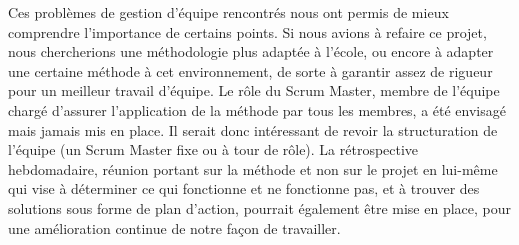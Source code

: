 
Ces problèmes de gestion d'équipe rencontrés nous ont permis de mieux comprendre l'importance de certains points. Si nous avions à refaire ce projet, nous chercherions une méthodologie plus adaptée à l'école, ou encore à adapter une certaine méthode à cet environnement, de sorte à garantir assez de rigueur pour un meilleur travail d'équipe. Le rôle du Scrum Master, membre de l'équipe chargé d'assurer l'application de la méthode par tous les membres, a été envisagé mais jamais mis en place. Il serait donc intéressant de revoir la structuration de l'équipe (un Scrum Master fixe ou à tour de rôle). La rétrospective hebdomadaire, réunion portant sur la méthode et non sur le projet en lui-même qui vise à déterminer ce qui fonctionne et ne fonctionne pas, et à trouver des solutions sous forme de plan d'action, pourrait également être mise en place, pour une amélioration continue de notre façon de travailler.\\








